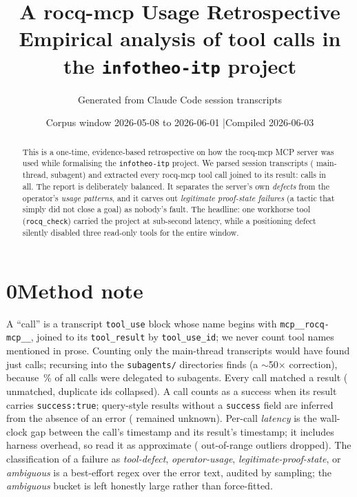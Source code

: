 \documentclass[11pt]{article}
\title{\textbf{A rocq-mcp Usage Retrospective}\\[2pt]
\large Empirical analysis of \Ntotal{} tool calls in the \texttt{infotheo-itp} project}
\author{Generated from Claude Code session transcripts}
\date{Corpus window 2026-05-08 to 2026-06-01 \quad|\quad Compiled 2026-06-03}
\newcommand{\tl}[1]{\texttt{#1}}
\newcommand{\rcheck}{\tl{rocq\_check}}
\begin{document}
\maketitle

\begin{abstract}
\noindent This is a one-time, evidence-based retrospective on how the
\textsf{rocq-mcp} MCP server was used while formalising the \texttt{infotheo-itp}
project. We parsed \Ntranscripts{} session transcripts (\Nmain{} main-thread,
\Nsub{} subagent) and extracted every \textsf{rocq-mcp} tool call joined to its
result: \Ntotal{} calls in all. The report is deliberately balanced. It separates
the server's own \emph{defects} from the operator's \emph{usage patterns}, and it
carves out \emph{legitimate proof-state failures} (a tactic that simply did not
close a goal) as nobody's fault. The headline: one workhorse tool (\rcheck) carried
the project at sub-second latency, while a positioning defect silently disabled
three read-only tools for the entire window.
\end{abstract}

\section*{0\quad Method note}
A ``call'' is a transcript \texttt{tool\_use} block whose name begins with
\texttt{mcp\_\_rocq-mcp\_\_}, joined to its \texttt{tool\_result} by
\texttt{tool\_use\_id}; we never count tool names mentioned in prose. Counting only
the main-thread transcripts would have found just \Nmaincalls{} calls; recursing
into the \texttt{subagents/} directories finds \Ntotal{} (a \(\sim\)50$\times$
correction), because \Subpct\,\% of all calls were delegated to subagents. Every
call matched a result (\Nunmatched{} unmatched, \Dupcollapsed{} duplicate ids
collapsed). A call counts as a success when its result carries
\texttt{success:true}; query-style results without a \texttt{success} field are
inferred from the absence of an error (\Nunknown{} remained unknown). Per-call
\emph{latency} is the wall-clock gap between the call's timestamp and its result's
timestamp; it includes harness overhead, so read it as approximate
(\Latdropped{} out-of-range outliers dropped). The classification of a failure as
\emph{tool-defect}, \emph{operator-usage}, \emph{legitimate-proof-state}, or
\emph{ambiguous} is a best-effort regex over the error text, audited by sampling;
the \emph{ambiguous} bucket is left honestly large rather than force-fitted.
\end{document}
